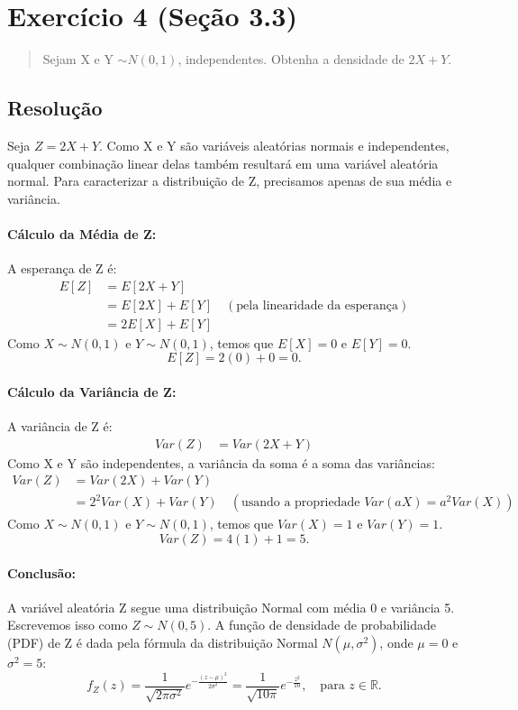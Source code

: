 \documentclass[12pt]{article}
\begin{document}
\pagebreak

\section{Exercício 4 (Seção 3.3)}

\begin{quote}
Sejam X e Y $\sim N(0,1)$, independentes. Obtenha a densidade de $2X+Y$.
\end{quote}

\subsection*{Resolução}

Seja $Z = 2X+Y$. Como X e Y são variáveis aleatórias normais e independentes, qualquer combinação linear delas também resultará em uma variável aleatória normal. Para caracterizar a distribuição de Z, precisamos apenas de sua média e variância.

\paragraph{Cálculo da Média de Z:}
A esperança de Z é:
\begin{align*}
E[Z] &= E[2X+Y] \\
&= E[2X] + E[Y] \quad (\text{pela linearidade da esperança}) \\
&= 2E[X] + E[Y]
\end{align*}
Como $X \sim N(0,1)$ e $Y \sim N(0,1)$, temos que $E[X]=0$ e $E[Y]=0$.
\[ E[Z] = 2(0) + 0 = 0. \]

\paragraph{Cálculo da Variância de Z:}
A variância de Z é:
\begin{align*}
Var(Z) &= Var(2X+Y)
\end{align*}
Como X e Y são independentes, a variância da soma é a soma das variâncias:
\begin{align*}
Var(Z) &= Var(2X) + Var(Y) \\
&= 2^2 Var(X) + Var(Y) \quad (\text{usando a propriedade } Var(aX) = a^2Var(X))
\end{align*}
Como $X \sim N(0,1)$ e $Y \sim N(0,1)$, temos que $Var(X)=1$ e $Var(Y)=1$.
\[ Var(Z) = 4(1) + 1 = 5. \]

\paragraph{Conclusão:}
A variável aleatória Z segue uma distribuição Normal com média 0 e variância 5. Escrevemos isso como $Z \sim N(0,5)$.
A função de densidade de probabilidade (PDF) de Z é dada pela fórmula da distribuição Normal $N(\mu, \sigma^2)$, onde $\mu=0$ e $\sigma^2=5$:
\[ f_Z(z) = \frac{1}{\sqrt{2\pi\sigma^2}} e^{-\frac{(z-\mu)^2}{2\sigma^2}} = \frac{1}{\sqrt{10\pi}} e^{-\frac{z^2}{10}}, \quad \text{para } z \in \mathbb{R}. \]
\hfill \qedsymbol
\end{document}

